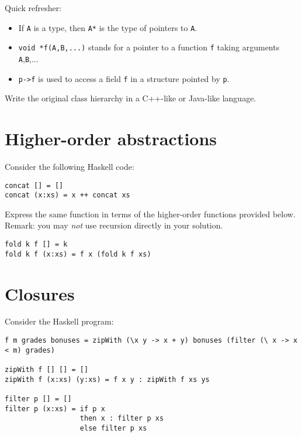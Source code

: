\documentclass{article}
\begin{document}
Quick refresher:
\begin{itemize}
\item If \texttt{A} is a type, then \texttt{A*} is the type of
  pointers to \texttt{A}.
\item \texttt{void *f(A,B,...)} stands for a pointer to a function
  \texttt{f} taking arguments \texttt{A},\texttt{B},...
\item \texttt{p->f} is used to access a field \texttt{f} in a
  structure pointed by \texttt{p}.
\end{itemize}

Write the original class hierarchy in a C++-like or Java-like language.


\newpage
\section{Higher-order abstractions}

Consider the following Haskell code:
\begin{verbatim}
concat [] = []
concat (x:xs) = x ++ concat xs
\end{verbatim}


% 


Express the same function in terms of the higher-order functions
provided below.  Remark: you may \emph{not} use recursion directly in
your solution.

\begin{verbatim}
fold k f [] = k
fold k f (x:xs) = f x (fold k f xs)
\end{verbatim}



\section{Closures}

Consider the Haskell program:
\begin{verbatim}
f m grades bonuses = zipWith (\x y -> x + y) bonuses (filter (\ x -> x < m) grades)

zipWith f [] [] = []
zipWith f (x:xs) (y:xs) = f x y : zipWith f xs ys

filter p [] = []
filter p (x:xs) = if p x
                  then x : filter p xs
                  else filter p xs
\end{verbatim}
\end{document}
